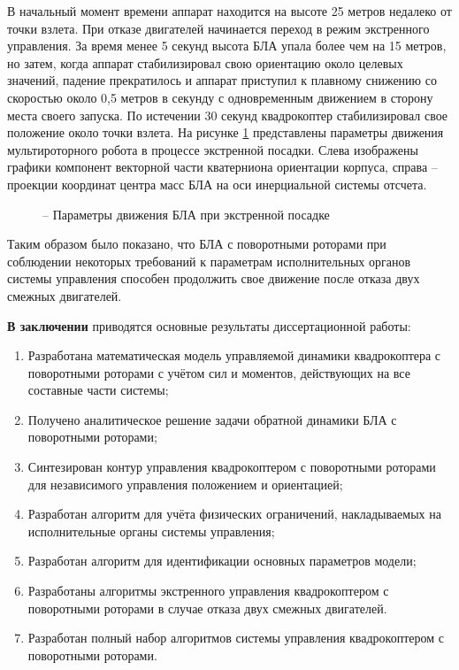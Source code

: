 В начальный момент времени аппарат находится на высоте 25 метров недалеко от точки взлета.
При отказе двигателей начинается переход в режим экстренного управления.
За время менее 5 секунд высота БЛА упала более чем на 15 метров, но затем, когда аппарат стабилизировал свою ориентацию около целевых значений, падение прекратилось и аппарат приступил к плавному снижению со скоростью около 0,5 метров в секунду с одновременным движением в сторону места своего запуска. По истечении 30 секунд квадрокоптер стабилизировал свое положение около точки взлета. На рисунке \ref{fig:em_coords} представлены параметры движения мультироторного робота в процессе экстренной посадки. Слева изображены графики компонент векторной части кватерниона ориентации корпуса, справа -- проекции координат центра масс БЛА на оси инерциальной системы отсчета.
\begin{figure}[H]
	
	\centering
	\hfil
	\subfloat[координата x]{\texttt{[image: em/x]}}
	
	 \hfil 
	\subfloat[координата y]{\texttt{[image: em/y]}}  
	
	\hfil
	\subfloat[координата z]{\texttt{[image: em/z]}}
	\caption{ -- Параметры движения БЛА при экстренной посадке}
	\label{fig:em_coords}
\end{figure}

Таким образом было показано, что БЛА с поворотными роторами при соблюдении некоторых требований к параметрам исполнительных органов системы управления способен продолжить свое движение после отказа двух смежных двигателей.

\textbf{В заключении} приводятся основные результаты диссертационной работы:
\begin{enumerate}
	\item Разработана математическая модель управляемой динамики квадрокоптера с поворотными роторами с учётом сил и моментов, действующих на все составные части системы;
	\item  Получено аналитическое решение задачи обратной динамики БЛА с поворотными роторами;
	\item Синтезирован контур управления квадрокоптером с поворотными роторами для независимого управления положением и ориентацией; 
	\item Разработан алгоритм для учёта физических ограничений, накладываемых на исполнительные органы системы управления;
	\item Разработан алгоритм для идентификации основных параметров модели;
	\item Разработаны алгоритмы экстренного управления квадрокоптером с поворотными роторами в случае отказа двух смежных двигателей.
	\item Разработан полный набор алгоритмов системы управления квадрокоптером с поворотными роторами.
\end{enumerate}
